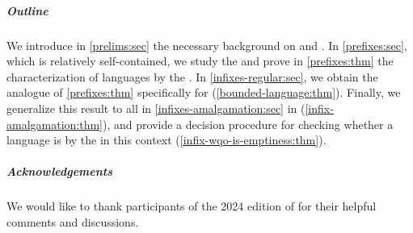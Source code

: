 \subparagraph{Outline} 
We introduce in \cref{prelims:sec} the
necessary background on  and .
In
\cref{prefixes:sec}, which is relatively
self-contained, we study the  and prove in
\cref{prefixes:thm} the characterization of 
languages by the . In
\cref{infixes-regular:sec}, we
obtain the  analogue of \cref{prefixes:thm}
specifically for 
(\cref{bounded-language:thm}). Finally, 
we generalize this result to all
 in \cref{infixes-amalgamation:sec}
in
(\cref{infix-amalgamation:thm}),
and provide a decision procedure for checking whether a language is
 by the  in
this context (\cref{infix-wqo-is-emptiness:thm}).

\subparagraph{Acknowledgements} We would like to thank participants of the 2024
edition of  for their helpful comments and discussions.
